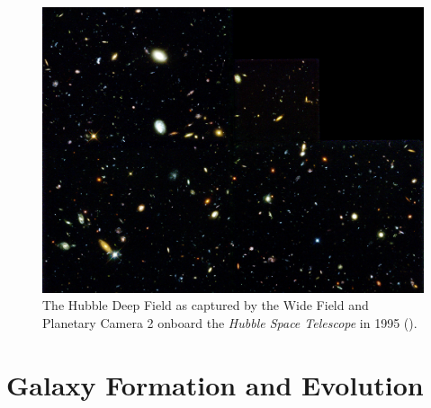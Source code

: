 \begin{figure}
    \centering
	\includegraphics[width=0.9\columnwidth]{Figures/hubble_deep_field.pdf}
	\caption[Hubble Deep Field as captured by the \textit{Hubble Space Telescope}]{The Hubble Deep Field as captured by the Wide Field and Planetary Camera 2 onboard the \textit{Hubble Space Telescope} in 1995 (\citealt{Williams_1996}).}
	\label{fig:hubble_deep_field}
\end{figure}

\section{Galaxy Formation and Evolution}

